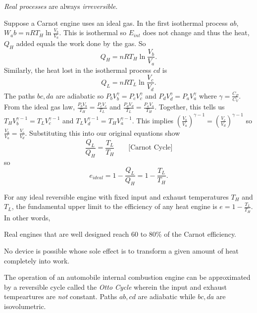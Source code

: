 \begin{remark}
    \emph{Real processes} are always \emph{irreversible}.
\end{remark}
\begin{remark}
    Suppose a Carnot engine uses an ideal gas. In the first isothermal process $ab$, $W_ab = nRT_H\ln\frac{V_b}{V_a}$. This is isothermal so $E_{int}$ does not change and thus the heat, $Q_H$ added equals the work done by the gas. So $$Q_H = nRT_H \ln\frac{V_b}{V_a}.$$ Similarly, the heat lost in the isothermal process $cd$ is $$Q_L = nRT_L \ln\frac{V_c}{V_d}.$$ The paths $bc, da$ are adiabatic so $P_bV_b^{\gamma} = P_cV_c^{\gamma}$ and $P_dV_d^{\gamma} = P_aV_a^{\gamma}$ where $\gamma = \frac{C_P}{C_V}.$ From the ideal gas law, $\frac{P_bV_b}{T_H} = \frac{P_cV_c}{T_L}$ and $\frac{P_dV_d}{T_L} = \frac{P_aV_a}{T_H}.$ Together, this tells us $T_HV_b^{\gamma - 1} = T_LV_c^{\gamma - 1}$ and $T_LV_d^{\gamma - 1} = T_HV_a^{\gamma - 1}$. This implies $(\frac{V_b}{V_a})^{\gamma - 1} = (\frac{V_c}{V_d})^{\gamma - 1}$ so $\frac{V_b}{V_a}=\frac{V_c}{V_d}$. Substituting this into our original equations show $$\frac{Q_L}{Q_H} = \frac{T_L}{T_H} \quad\quad \text{[Carnot Cycle]}$$ so $$e_{ideal} = 1 - \frac{Q_L}{Q_H} = 1 - \frac{T_L}{T_H}.$$ 
\end{remark}
\begin{theorem}
    For any ideal reversible engine with fixed input and exhaust temperatures $T_H$ and $T_L$, the fundamental upper limit to the efficiency of any heat engine is $e = 1-\frac{T_L}{T_H}$. In other words,
\end{theorem}
\begin{note}
    Real engines that are well designed reach 60 to 80\% of the Carnot efficiency.
\end{note}
\begin{definition}
    No device is possible whose sole effect is to transform a given amount of heat completely into work.
\end{definition}
\begin{definition}
    The operation of an automobile internal combustion engine can be approximated by a reversible cycle called the \emph{Otto Cycle} wherein the input and exhaust tempeartures are \emph{not} constant. Paths $ab, cd$ are adiabatic while $bc, da$ are isovolumetric. 
\end{definition}
